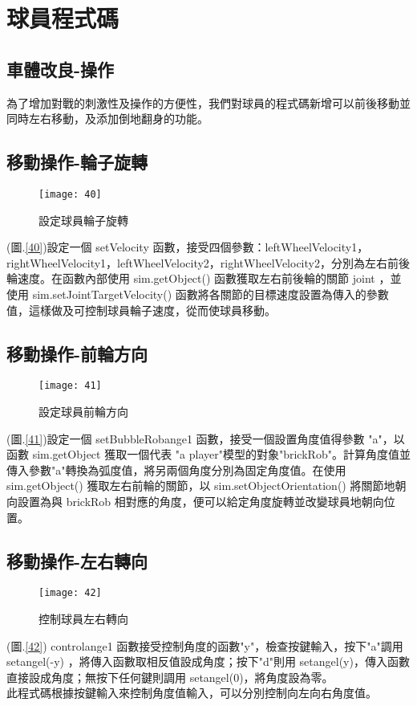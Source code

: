 \chapter{球員程式碼}
\renewcommand{\baselinestretch}{10.0} %
\setcounter{page}{4}  %
\fontsize{14pt}{2.5pt}\sectionef
\section{車體改良-操作}
  為了增加對戰的刺激性及操作的方便性，我們對球員的程式碼新增可以前後移動並同時左右移動，及添加倒地翻身的功能。\\[1pt]

\section{移動操作-輪子旋轉}
\begin{figure}[hbt!]
\begin{center}
\texttt{[image: 40]}
\caption{\Large 設定球員輪子旋轉}\label{fig.40}
\end{center}
\end{figure}
(圖.\ref{40})設定一個 setVelocity 函數，接受四個參數：leftWheelVelocity1，rightWheelVelocity1，leftWheelVelocity2，rightWheelVelocity2，分別為左右前後輪速度。在函數內部使用 sim.getObject() 函數獲取左右前後輪的關節 joint ，並使用 sim.setJointTargetVelocity() 函數將各關節的目標速度設置為傳入的參數值，這樣做及可控制球員輪子速度，從而使球員移動。\\
\newpage
\section{移動操作-前輪方向}
\begin{figure}[hbt!]
\begin{center}
\texttt{[image: 41]}
\caption{\Large 設定球員前輪方向}\label{fig.41}
\end{center}
\end{figure}
(圖.\ref{41})設定一個 setBubbleRobange1 函數，接受一個設置角度值得參數 "a"，以函數 sim.getObject 獲取一個代表 "a player"模型的對象"brickRob"。計算角度值並傳入參數"a"轉換為弧度值，將另兩個角度分別為固定角度值。在使用 sim.getObject() 獲取左右前輪的關節，以 sim.setObjectOrientation() 將關節地朝向設置為與 brickRob 相對應的角度，便可以給定角度旋轉並改變球員地朝向位置。\\
\section{移動操作-左右轉向}
\begin{figure}[hbt!]
\begin{center}
\texttt{[image: 42]}
\caption{\Large 控制球員左右轉向}\label{fig.42}
\end{center}
\end{figure}
(圖.\ref{42}) controlange1 函數接受控制角度的函數"y"，檢查按鍵輸入，按下"a"調用 setangel(-y) ，將傳入函數取相反值設成角度；按下"d"則用 setangel(y)，傳入函數直接設成角度；無按下任何鍵則調用 setangel(0)，將角度設為零。\\
  此程式碼根據按鍵輸入來控制角度值輸入，可以分別控制向左向右角度值。\\
